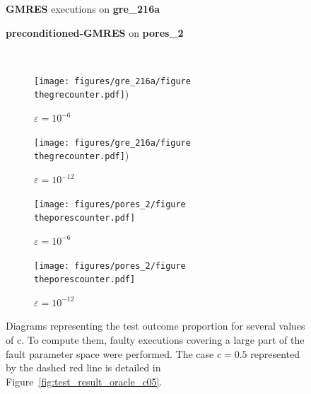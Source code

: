 \documentclass[twoside]{article}
\newcounter{fig}\setcounter{fig}{0}
\begin{document}
  \begin{figure}[H]
    \centering
    
    \begin{minipage}[b]{0.45\linewidth}
      \centering
      \textbf{GMRES} executions on \textbf{gre_216a} 
    \end{minipage}
    \quad
    \begin{minipage}{0.45\linewidth}
      \centering
      \textbf{preconditioned-GMRES} on \textbf{pores_2}
    \end{minipage}\\


    \begin{minipage}[b]{0.48\linewidth}
      
      \begin{subfigure}[t]{\linewidth}
        \centering
        \texttt{[image: figures/gre\_216a/figure\\thegrecounter.pdf]})
        \caption{$\varepsilon = 10^{-6}$}\label{fig:gre_216a_test_result_oracle_0}	
      \end{subfigure}
      \quad
      \begin{subfigure}[t]{\linewidth}
        \centering
        \texttt{[image: figures/gre\_216a/figure\\thegrecounter.pdf]})
        \caption{$\varepsilon = 10^{-12}$}\label{fig:gre_216a_test_result_oracle_1}	
      \end{subfigure}
    \end{minipage}
    \quad
    \begin{minipage}[b]{0.48\linewidth}
      
      \begin{subfigure}[t]{\linewidth}
        \centering
        \texttt{[image: figures/pores\_2/figure\\theporescounter.pdf]}
        \caption{$\varepsilon = 10^{-6}$}\label{fig:pores_2_test_result_oracle_0}	
      \end{subfigure}
      \quad
      \begin{subfigure}[t]{\linewidth}
        \centering
        \texttt{[image: figures/pores\_2/figure\\theporescounter.pdf]}
        \caption{$\varepsilon = 10^{-12}$}\label{fig:pores_2_test_result_oracle_1}	
      \end{subfigure}
      
    \end{minipage}
    \caption{Diagrams representing the test outcome proportion for several values of c. To compute them, faulty executions covering a large part of the fault parameter space were performed. The case $c = 0.5$ represented by the dashed red line is detailed in Figure~\ref{fig:test_result_oracle_c05}.}\label{fig:test_result_oracle}
  \end{figure}
\end{document}
